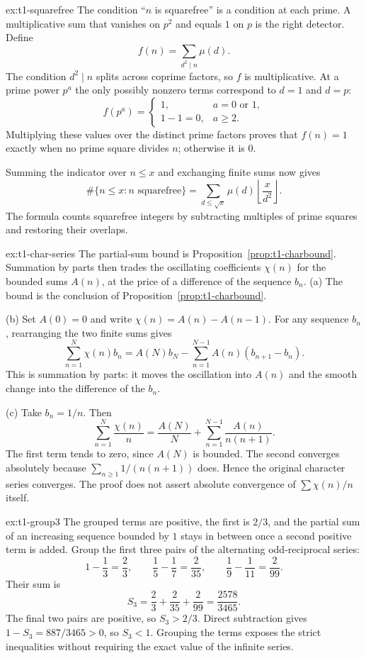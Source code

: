 \begin{solution}{ex:t1-squarefree}
\idea The condition ``$n$ is squarefree'' is a condition at each prime. A multiplicative sum that vanishes on $p^2$ and equals $1$ on $p$ is the right detector.
\writeup Define
\[
f(n)=\sum_{d^2\mid n}\mu(d).
\]
The condition $d^2\mid n$ splits across coprime factors, so $f$ is multiplicative. At a prime power $p^a$ the only possibly nonzero terms correspond to $d=1$ and $d=p$:
\[
f(p^a)=
\begin{cases}
1,&a=0\text{ or }1,\\
1-1=0,&a\ge2.
\end{cases}
\]
Multiplying these values over the distinct prime factors proves that $f(n)=1$ exactly when no prime square divides $n$; otherwise it is $0$.

Summing the indicator over $n\le x$ and exchanging finite sums now gives
\[
\#\{n\le x:n\text{ squarefree}\}
=\sum_{d\le\sqrt{x}}\mu(d)
  \left\lfloor\frac{x}{d^2}\right\rfloor.
\]
The formula counts squarefree integers by subtracting multiples of prime squares and restoring their overlaps.
\end{solution}

\begin{solution}{ex:t1-char-series}
\idea The partial-sum bound is Proposition~\ref{prop:t1-charbound}. Summation by parts then trades the oscillating coefficients $\chi(n)$ for the bounded sums $A(n)$, at the price of a difference of the sequence $b_n$.
\writeup (a) The bound is the conclusion of Proposition~\ref{prop:t1-charbound}.

(b) Set $A(0)=0$ and write $\chi(n)=A(n)-A(n-1)$. For any sequence $b_n$, rearranging the two finite sums gives
\[
\sum_{n=1}^N\chi(n)b_n
=A(N)b_N-\sum_{n=1}^{N-1}A(n)(b_{n+1}-b_n).
\]
This is summation by parts: it moves the oscillation into $A(n)$ and the smooth change into the difference of the $b_n$.

(c) Take $b_n=1/n$. Then
\[
\sum_{n=1}^N\frac{\chi(n)}n
=\frac{A(N)}N+
\sum_{n=1}^{N-1}\frac{A(n)}{n(n+1)}.
\]
The first term tends to zero, since $A(N)$ is bounded. The second converges absolutely because $\sum_{n\ge1}1/(n(n+1))$ does. Hence the original character series converges. The proof does not assert absolute convergence of $\sum\chi(n)/n$ itself.
\end{solution}

\begin{solution}{ex:t1-group3}
\idea The grouped terms are positive, the first is $2/3$, and the partial sum of an increasing sequence bounded by $1$ stays in between once a second positive term is added.
\writeup Group the first three pairs of the alternating odd-reciprocal series:
\[
1-\frac13=\frac23,\qquad
\frac15-\frac17=\frac2{35},\qquad
\frac19-\frac1{11}=\frac2{99}.
\]
Their sum is
\[
S_3=\frac23+\frac2{35}+\frac2{99}
=\frac{2578}{3465}.
\]
The final two pairs are positive, so $S_3>2/3$. Direct subtraction gives
$1-S_3=887/3465>0$, so $S_3<1$. Grouping the terms exposes the strict inequalities without requiring the exact value of the infinite series.
\end{solution}

